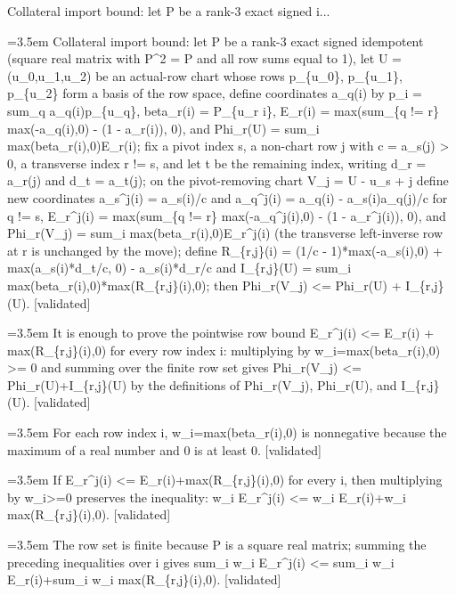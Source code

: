 \documentclass{article}
\newcommand{\step}[1]{\par\noindent\hangindent=3.5em\hangafter=1%
  \makebox[3.5em][l]{\textbf{#1.}}}
\newcommand{\steptag}[1]{\hfill{\small\textsf{[#1]}}}
\begin{document}
\begin{proofbox}{Collateral import bound: let P be a rank-3 exact signed i...}
\step{1} Collateral import bound: let P be a rank-3 exact signed idempotent (square real matrix with P\textasciicircum{}2 = P and all row sums equal to 1), let U = (u\_0,u\_1,u\_2) be an actual-row chart whose rows p\_\{u\_0\}, p\_\{u\_1\}, p\_\{u\_2\} form a basis of the row space, define coordinates a\_q(i) by p\_i = sum\_q a\_q(i)p\_\{u\_q\}, beta\_r(i) = P\_\{u\_r i\}, E\_r(i) = max(sum\_\{q != r\} max(-a\_q(i),0) - (1 - a\_r(i)), 0), and Phi\_r(U) = sum\_i max(beta\_r(i),0)E\_r(i); fix a pivot index s, a non-chart row j with c = a\_s(j) > 0, a transverse index r != s, and let t be the remaining index, writing d\_r = a\_r(j) and d\_t = a\_t(j); on the pivot-removing chart V\_j = U - u\_s + j define new coordinates a\_s\textasciicircum{}j(i) = a\_s(i)/c and a\_q\textasciicircum{}j(i) = a\_q(i) - a\_s(i)a\_q(j)/c for q != s, E\_r\textasciicircum{}j(i) = max(sum\_\{q != r\} max(-a\_q\textasciicircum{}j(i),0) - (1 - a\_r\textasciicircum{}j(i)), 0), and Phi\_r(V\_j) = sum\_i max(beta\_r(i),0)E\_r\textasciicircum{}j(i) (the transverse left-inverse row at r is unchanged by the move); define R\_\{r,j\}(i) = (1/c - 1)*max(-a\_s(i),0) + max(a\_s(i)*d\_t/c, 0) - a\_s(i)*d\_r/c and I\_\{r,j\}(U) = sum\_i max(beta\_r(i),0)*max(R\_\{r,j\}(i),0); then Phi\_r(V\_j) <= Phi\_r(U) + I\_\{r,j\}(U). \steptag{validated} \\[6pt]
\step{1.1} It is enough to prove the pointwise row bound E\_r\textasciicircum{}j(i) <= E\_r(i) + max(R\_\{r,j\}(i),0) for every row index i: multiplying by w\_i=max(beta\_r(i),0) >= 0 and summing over the finite row set gives Phi\_r(V\_j) <= Phi\_r(U)+I\_\{r,j\}(U) by the definitions of Phi\_r(V\_j), Phi\_r(U), and I\_\{r,j\}(U). \steptag{validated} \\[6pt]
\step{1.1.1} For each row index i, w\_i=max(beta\_r(i),0) is nonnegative because the maximum of a real number and 0 is at least 0. \steptag{validated} \\[4pt]
\step{1.1.2} If E\_r\textasciicircum{}j(i) <= E\_r(i)+max(R\_\{r,j\}(i),0) for every i, then multiplying by w\_i>=0 preserves the inequality: w\_i E\_r\textasciicircum{}j(i) <= w\_i E\_r(i)+w\_i max(R\_\{r,j\}(i),0). \steptag{validated} \\[4pt]
\step{1.1.3} The row set is finite because P is a square real matrix; summing the preceding inequalities over i gives sum\_i w\_i E\_r\textasciicircum{}j(i) <= sum\_i w\_i E\_r(i)+sum\_i w\_i max(R\_\{r,j\}(i),0). \steptag{validated} \\[4pt]

\end{proofbox}
\end{document}
